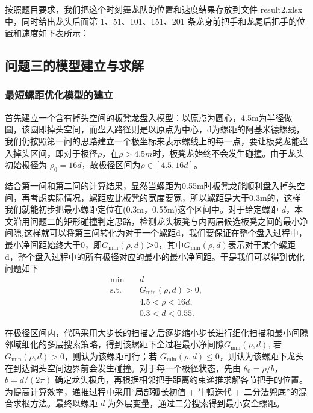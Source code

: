 \documentclass[UTF-8,a4paper,zihao=-4]{ctexart}
\begin{document}
按照题目要求，我们把这个时刻舞龙队的位置和速度结果存放到文件 result2.xlsx 中，同时给出龙头后面第 1、51、101、151、201 条龙身前把手和龙尾后把手的位置和速度如下表所示：
\begin{table}[htbp]
    \centering
    \caption{各节板凳的位置与速度}
    \label{tab:position_velocity}

\end{table}


\subsection{问题三的模型建立与求解}

\subsubsection{最短螺距优化模型的建立}
首先建立一个含有掉头空间的板凳龙盘入模型：以原点为圆心，4.5m为半径做圆，该圆即掉头空间，而盘入路径则是以原点为中心，d为螺距的阿基米德螺线，我们仍按照第一问的思路建立一个极坐标来表示螺线上的每一点，要让板凳龙能盘入掉头区间，即对于极径$\rho$，在$\rho>4.5m$时，板凳龙始终不会发生碰撞。由于龙头初始极径为 $\rho_0=16d$，故极径区间为$\rho\in[4.5,16d]$。

结合第一问和第二问的计算结果，显然当螺距为0.55m时板凳龙能顺利盘入掉头空间，再考虑实际情况，螺距应比板凳的宽度要宽，所以螺距是大于0.3m的，这样我们就能初步把最小螺距定位在(0.3m，0.55m)这个区间中。对于给定螺距 $d$，本文沿用问题二的矩形碰撞判定思路，检测龙头板凳与内两层候选板凳之间的最小净间隙,这样就可以将第三问转化为对于一个螺距d，我们要保证在整个盘入过程中，最小净间距始终大于0，即$G_{\min}(\rho,d)$＞0，其中$G_{\min}(\rho,d)$表示对于某个螺距d，整个盘入过程中的所有极径对应的最小的最小净间距。于是我们可以得到优化问题如下
\begin{equation}
\begin{aligned}
    \min\quad & d\\
    \text{s.t.}\quad 
    & G_{\min}(\rho,d)>0,\\
    & 4.5<\rho<16d,\\
    & 0.3<d<0.55.
\end{aligned}
\end{equation}

在极径区间内，代码采用大步长的扫描之后逐步缩小步长进行细化扫描和最小间隙邻域细化的多层搜索策略，得到该螺距下全过程最小净间隙$G_{\min}(\rho,d)$,
若 $G_{\min}(\rho,d)> 0$，则认为该螺距可行；若 $G_{\min}(\rho,d)\le0$，则认为该螺距下龙头在到达调头空间边界前会发生碰撞。对于每一个极径状态，先由 $\theta_0=\rho/b$，$b=d/(2\pi)$ 确定龙头极角，再根据相邻把手距离约束递推求解各节把手的位置。为提高计算效率，递推过程中采用“局部弧长初值 + 牛顿迭代 + 二分法兜底”的混合求根方法。最终以螺距 $d$ 为外层变量，通过二分搜索得到最小安全螺距。
\end{document}
